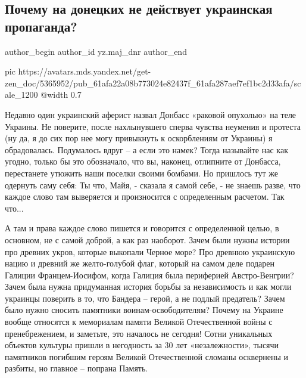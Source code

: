  
 
 
 
 
\subsection{Почему на донецких не действует украинская пропаганда?}
\label{sec:07_12_2021.yz.maj_dnr.1.ukr_propaganda_doneckie}


\ifcmt
 author_begin
   author_id yz.maj_dnr
 author_end
\fi

\ifcmt
  pic https://avatars.mds.yandex.net/get-zen_doc/5365952/pub_61afa22a08b773024e82437f_61afa287aef7ef1bc2d33afa/scale_1200
  @width 0.7
\fi

Недавно один украинский аферист назвал Донбасс «раковой опухолью» на теле
Украины. Не поверите, после нахлынувшего сперва чувства неумения и протеста (ну
да, я до сих пор нее могу привыкнуть к оскорблениям от Украины) я обрадовалась.
Подумалось вдруг – а если это намек? Тогда называйте нас как угодно, только бы
это обозначало, что вы, наконец, отлипните от Донбасса, перестанете утюжить
наши поселки своими бомбами. Но пришлось тут же одернуть саму себя: Ты что,
Майя, - сказала я самой себе, - не знаешь разве, что каждое слово там
выверяется и произносится с определенным расчетом. Так что...

А там и права каждое слово пишется и говорится с определенной целью, в
основном, не с самой доброй, а как раз наоборот. Зачем были нужны истории про
древних укров, которые выкопали Черное море? Про древнюю украинскую нацию и
древний же желто-голубой флаг, который на самом деле подарен Галиции
Францем-Иосифом, когда Галиция была периферией Австро-Венгрии? Зачем была нужна
придуманная история борьбы за независимость и как могли украинцы поверить в то,
что Бандера – герой, а не подлый предатель? Зачем было нужно сносить памятники
воинам-освободителям? Почему на Украине вообще относятся к мемориалам памяти
Великой Отечественной войны с пренебрежением, и заметьте, это началось не
сегодня! Сотни уникальных объектов культуры пришли в негодность за 30 лет
«незалежности», тысячи памятников погибшим героям Великой Отечественной сломаны
осквернены и разбиты, но главное – попрана Память.

